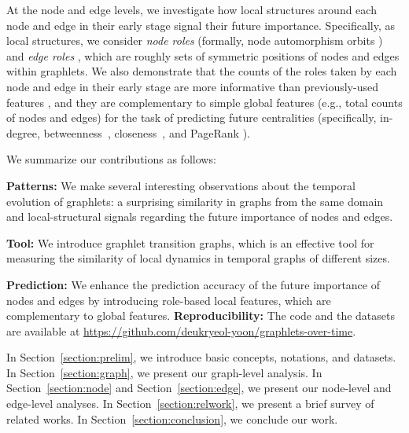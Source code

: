 At the node and edge levels, we investigate how local structures around each node and edge in their early stage signal their future importance.
Specifically, as local structures, we consider \textit{node roles} (formally, node automorphism orbits \cite{prvzulj2007biological}) and \textit{edge roles} \cite{hovcevar2016computation}, which are roughly sets of symmetric positions of nodes and edges within graphlets.
We also demonstrate that the counts of the roles taken by each node and edge in their early stage are more informative than previously-used features \cite{yang2014predicting}, and they are complementary to simple global features (e.g., total counts of nodes and edges) for the task of predicting future centralities (specifically, in-degree, betweenness~\cite{freeman1977set}, closeness~\cite{bavelas1950communication}, and PageRank \cite{page1999PageRank}).


We summarize our contributions as follows: 
\bit
    \item \textbf{Patterns:} We make several interesting observations about the temporal evolution of graphlets: a surprising similarity in graphs from the same domain and local-structural signals regarding the future importance of nodes and edges.
    \item \textbf{Tool:} We introduce graphlet transition graphs, which is an effective tool for measuring the similarity of local dynamics in temporal graphs of different sizes.
    \item \textbf{Prediction:} We enhance the prediction accuracy of the future importance of nodes and edges by introducing role-based local features, which are complementary to global features.
\eit
\noindent\textbf{Reproducibility:} The code and the datasets are available at 
\url{https://github.com/deukryeol-yoon/graphlets-over-time}.

In Section~\ref{section:prelim}, we introduce basic concepts, notations, and datasets. In Section~\ref{section:graph}, we present our graph-level analysis. %
In Section~\ref{section:node} and Section~\ref{section:edge}, we present our node-level and edge-level analyses. %
In Section~\ref{section:relwork}, we present a brief survey of related works.
In Section~\ref{section:conclusion}, we conclude our work.